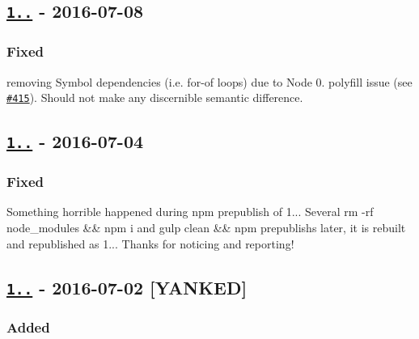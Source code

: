 \subsection*{\href{https://github.com/benmosher/eslint-plugin-import/compare/v1.10.2...v1.10.3}{\tt 1..} -\/ 2016-\/07-\/08}

\subsubsection*{Fixed}


\begin{DoxyItemize}
\item removing {\ttfamily Symbol} dependencies (i.\+e. {\ttfamily for-\/of} loops) due to Node 0. polyfill issue (see \href{https://github.com/benmosher/eslint-plugin-import/issues/415}{\tt \#415}). Should not make any discernible semantic difference.
\end{DoxyItemize}

\subsection*{\href{https://github.com/benmosher/eslint-plugin-import/compare/v1.10.1...v1.10.2}{\tt 1..} -\/ 2016-\/07-\/04}

\subsubsection*{Fixed}


\begin{DoxyItemize}
\item Something horrible happened during {\ttfamily npm prepublish} of 1... Several {\ttfamily rm -\/rf node\+\_\+modules \&\& npm i} and {\ttfamily gulp clean \&\& npm prepublish}s later, it is rebuilt and republished as 1... Thanks \href{https://github.com/rhettlivingston}{\tt } for noticing and reporting!
\end{DoxyItemize}

\subsection*{\href{https://github.com/benmosher/eslint-plugin-import/compare/v1.10.0...v1.10.1}{\tt 1..} -\/ 2016-\/07-\/02 \mbox{[}Y\+A\+N\+K\+ED\mbox{]}}

\subsubsection*{Added}


